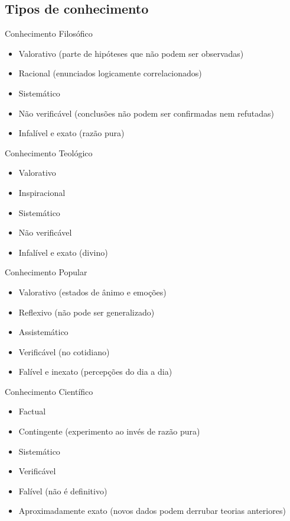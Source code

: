\documentclass{beamer}
\begin{document}
\subsection{Tipos de conhecimento}

\begin{frame}{Conhecimento Filosófico}
  \begin{itemize}
  \item Valorativo (parte de hipóteses que não podem ser observadas)
  \item Racional (enunciados logicamente correlacionados)
  \item Sistemático
  \item Não verificável (conclusões não podem ser confirmadas nem
    refutadas)
  \item Infalível e exato (razão pura)
  \end{itemize}
\end{frame}

\begin{frame}{Conhecimento Teológico}
  \begin{itemize}
  \item Valorativo
  \item Inspiracional
  \item Sistemático
  \item Não verificável
  \item Infalível e exato (divino)
  \end{itemize}
\end{frame}

\begin{frame}{Conhecimento Popular}
  \begin{itemize}
  \item Valorativo (estados de ânimo e emoções)
  \item Reflexivo (não pode ser generalizado)
  \item Assistemático
  \item Verificável (no cotidiano)
  \item Falível e inexato (percepções do dia a dia)
  \end{itemize}
\end{frame}

\begin{frame}{Conhecimento Científico}
  \begin{itemize}
  \item Factual
  \item Contingente (\alert{experimento} ao invés de razão pura)
  \item Sistemático 
  \item \alert{Verificável}
  \item Falível (não é definitivo)
  \item Aproximadamente exato (novos dados podem derrubar teorias
    anteriores)
  \end{itemize}
\end{frame}
\end{document}
